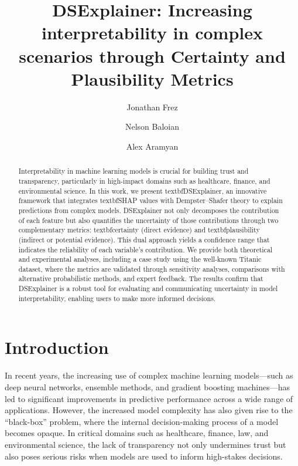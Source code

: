 \documentclass[acmlarge]{acmart}
\title{DSExplainer: Increasing interpretability in complex scenarios through Certainty and Plausibility Metrics}
\author{Jonathan Frez}
\affiliation{%
  \institution{Universidad Diego Portales}
  \city{Santiago}
  \country{Chile}
}
\author{Nelson Baloian}
\affiliation{%
  \institution{Universidad de Chile}
  \city{Santiago}
  \country{Chile}
}
\author{Alex Aramyan}
\affiliation{%
  \institution{?}
  \city{?}
  \country{Armenia}
}
\begin{document}
\begin{abstract}
Interpretability in machine learning models is crucial for building trust and transparency, particularly in high-impact domains such as healthcare, finance, and environmental science. In this work, we present textbf{DSExplainer}, an innovative framework that integrates textbf{SHAP values} with Dempster--Shafer theory to explain predictions from complex models. DSExplainer not only decomposes the contribution of each feature but also quantifies the uncertainty of those contributions through two complementary metrics: textbf{certainty} (direct evidence) and textbf{plausibility} (indirect or potential evidence). This dual approach yields a confidence range that indicates the reliability of each variable's contribution. We provide both theoretical and experimental analyses, including a case study using the well-known Titanic dataset, where the metrics are validated through sensitivity analyses, comparisons with alternative probabilistic methods, and expert feedback. The results confirm that DSExplainer is a robust tool for evaluating and communicating uncertainty in model interpretability, enabling users to make more informed decisions.
\end{abstract}





\maketitle

\section{Introduction}

In recent years, the increasing use of complex machine learning models—such as deep neural networks, ensemble methods, and gradient boosting machines—has led to significant improvements in predictive performance across a wide range of applications. However, the increased model complexity has also given rise to the “black-box” problem, where the internal decision-making process of a model becomes opaque. In critical domains such as healthcare, finance, law, and environmental science, the lack of transparency not only undermines trust but also poses serious risks when models are used to inform high-stakes decisions.
\end{document}
